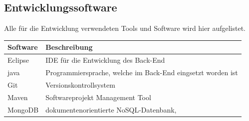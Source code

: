 \subsection{Entwicklungssoftware}
Alle für die Entwicklung verwendeten Tools und Software wird hier aufgelistet.
\begin{table}[H]
\begin{tabular}{|l|l|}
\hline 
\textbf{Software} & \textbf{Beschreibung} \\ 
\hline 
Eclipse	&	IDE für die Entwicklung des Back-End	 \\ \hline
java	&	Programmiersprache, welche im Back-End eingsetzt worden ist	 \\ \hline
Git	&	Versionskontrollsystem	 \\ \hline
Maven	&	Softwareprojekt Management Tool	 \\ \hline
MongoDB	&	 dokumentenorientierte NoSQL-Datenbank,	 \\ \hline
\end{tabular} 
\end{table}
